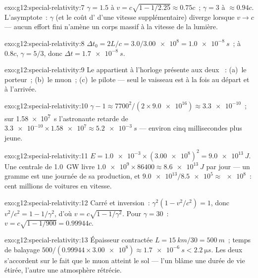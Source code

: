 \begin{solution}{exo:g12:special-relativity:7}
$\gamma = 1.5$ à $v = c\sqrt{1 - 1/2.25} \approx 0.75c$~;
$\gamma = 3$ à $\approx 0.94c$. L'asymptote~: $\gamma$ (et le coût
d' d'une vitesse supplémentaire) diverge
lorsque $v \to c$ --- aucun effort fini n'amène un corps massif à la
vitesse de la lumière.
\end{solution}

\begin{solution}{exo:g12:special-relativity:8}
$\Delta t_0 = 2L/c = 3.0/\num{3.00e8} = \qty{1.0e-8}{s}$~; à $0.8c$,
$\gamma = 5/3$, donc $\Delta t = \qty{1.7e-8}{s}$.
\end{solution}

\begin{solution}{exo:g12:special-relativity:9}
Le  appartient à l'horloge
présente aux deux ~: (a)~le
porteur~; (b)~le muon~; (c)~le pilote --- seul le vaisseau est à la
fois au départ et à l'arrivée.
\end{solution}

\begin{solution}{exo:g12:special-relativity:10}
$\gamma - 1 \approx 7700^2/(2 \times \num{9.0e16}) \approx
\num{3.3e-10}$~; sur \qty{1.58e7}{s} l'astronaute retarde de
$\num{3.3e-10} \times \num{1.58e7} \approx \qty{5.2e-3}{s}$ ---
environ cinq millisecondes plus jeune.
\end{solution}

\begin{solution}{exo:g12:special-relativity:11}
$E = \num{1.0e-3} \times (\num{3.00e8})^2 = \qty{9.0e13}{J}$. Une
centrale de \qty{1.0}{GW} livre $\num{1.0e9} \times 86400 \approx
\qty{8.6e13}{J}$ par jour --- un gramme est une journée de sa
production, et $\num{9.0e13}/\num{8.5e5} \approx \num{e8}$~: cent
millions de voitures en vitesse.
\end{solution}

\begin{solution}{exo:g12:special-relativity:12}
Carré et inversion~: $\gamma^2(1 - v^2/c^2) = 1$, donc
$v^2/c^2 = 1 - 1/\gamma^2$, d'où $v = c\sqrt{1 - 1/\gamma^2}$. Pour
$\gamma = 30$~: $v = c\sqrt{1 - 1/900} = 0.99944c$.
\end{solution}

\begin{solution}{exo:g12:special-relativity:13}
Épaisseur contractée $L = \qty{15}{km}/30 = \qty{500}{m}$~; temps de
balayage $500/(0.99944 \times \num{3.00e8}) \approx \qty{1.7e-6}{s} <
\qty{2.2}{\micro s}$. Les deux  s'accordent sur le fait
que le muon atteint le sol --- l'un blâme une durée de vie étirée,
l'autre une atmosphère rétrécie.
\end{solution}

